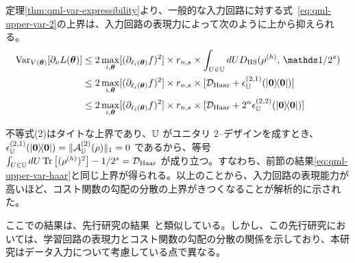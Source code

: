 
定理\ref{thm:qml-var-expressibility}より、一般的な入力回路に対する式~\eqref{eq:qml-upper-var-2}の上界は、入力回路の表現力によって次のように上から抑えられる。
\begin{align}
    \Var_{V(\bs{\th})}[\pd_\nu L(\bs{\th})]
    &\leq
    2\max_{i,\bs{\th}} [(\pd_{\ell_i(\bs{\th})}f)^2] \times r_{n,s} \times
    \int_{U\in\bbU}dU D_{\HS} (\rho^{(h)} ,\, \bbid/2^s )\label{eq:D_HS}\\
    &\leq
    2\max_{i,\bs{\th}} [(\pd_{\ell_i(\bs{\th})}f)^2] \times r_{n,s} \times
    [\calD_{\Haar} + \epsilon_{\bbU}^{(2,1)}(\dyad{\bs{0}})]\\
    &\leq
    2\max_{i,\bs{\th}} [(\pd_{\ell_i(\bs{\th})}f)^2] \times r_{n,s} \times
    [\calD_{\Haar} + 2^n\epsilon_{\bbU}^{(2,2)}(\dyad{\bs{0}})]
\end{align}

不等式(2)はタイトな上界であり、$\mathbb{U}$ がユニタリ $2$--デザインを成すとき、$\epsilon_{\bbU}^{(2,1)}(\dyad{\bs{0}}) = \|\calA_{\bbU}^{(2)}(\rho)\|_1 = 0$ であるから、等号 $\int_{U\in\mathbb{U}} dU \Tr\qty[(\rho^{({h})})^2] - 1/2^s = \mathcal{D}_{\mathrm{Haar}}$ が成り立つ。すなわち、前節の結果\eqref{eq:qml-upper-var-haar}と同じ上界が得られる。以上のことから、入力回路の表現能力が高いほど、コスト関数の勾配の分散の上界がきつくなることが解析的に示された。

ここでの結果は、先行研究の結果~\cite{holmes2022connecting}と類似している。しかし、この先行研究においては、学習回路の表現力とコスト関数の勾配の分散の関係を示しており、本研究はデータ入力について考慮している点で異なる。



